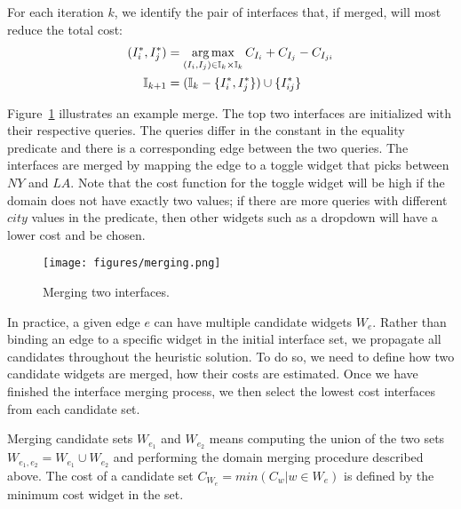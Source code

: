 For each iteration $k$, we identify the pair of interfaces that, if merged, will most reduce the total cost:
\begin{align*}
(I_i^*, I_j^*) &= \operatorname*{arg\,max}_{(I_i, I_j) \in \mathbb{I}_k\times\mathbb{I}_k} C_{I_i} + C_{I_j} - C_{I_{ji}}\\
\mathbb{I}_{k+1} &= (\mathbb{I}_k - \{I_i^*, I_j^*\}) \cup \{I_{ij}^*\}
\end{align*}


\begin{example}
Figure~\ref{fig:merging} illustrates an example merge. The top two interfaces are initialized with their respective queries.  The queries differ in the constant in the equality predicate and there is a corresponding edge between the two queries. The interfaces are merged by mapping the edge to a toggle widget that picks between $NY$ and $LA$.  Note that the cost function  for the toggle widget will be high if the domain does not have exactly two values; if there are more queries with different $city$ values in the predicate, then other widgets such as a dropdown will have a lower cost and be chosen.
\end{example}

\begin{figure}[thb]
  \centering
  \texttt{[image: figures/merging.png]}
  \caption{Merging two interfaces.}
  \label{fig:merging}
\end{figure}


In practice, a given edge $e$ can have multiple candidate widgets $W_e$.  Rather than binding an edge to a specific widget in the initial interface set, we propagate all candidates throughout the heuristic solution.  To do so, we need to define how two candidate widgets are merged, how their costs are estimated.  Once we have finished the interface merging process, we then select the lowest cost interfaces from each candidate set. %

Merging candidate sets $W_{e_1}$ and $W_{e_2}$ means computing the union of the two sets $W_{e_1,e_2} = W_{e_1} \cup W_{e_2}$ and performing the domain merging procedure described above. The cost of a candidate set $C_{W_e} = min(C_w | w \in W_e)$ is defined by the minimum cost widget in the set.


